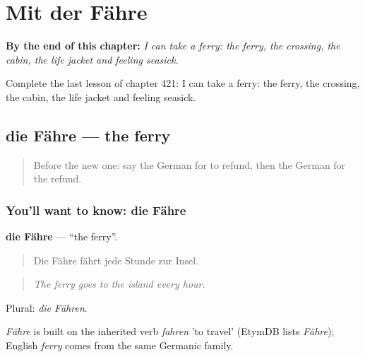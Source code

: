 
\chapter{Mit der Fähre}
\label{ch:ge-mit-der-fahre}

\begin{chapteropening}
\textbf{By the end of this chapter:} \emph{I can take a ferry: the ferry, the crossing, the cabin, the life jacket and feeling seasick.}

Complete the last lesson of chapter 421: I can take a ferry: the ferry, the crossing, the cabin, the life jacket and feeling seasick.
\end{chapteropening}

\section[die Fähre]{die Fähre — the ferry}

\label{lesson:GE-C421-faehre}



\begin{quote}
Before the new one: say the German for to refund, then the German for the refund.
\end{quote}

\subsection*{You'll want to know: die Fähre}
\textbf{die Fähre} — \textquotedblleft{}the ferry\textquotedblright{}.

\begin{quote}
Die Fähre fährt jede Stunde zur Insel.
\end{quote}

\begin{quote}
\emph{The ferry goes to the island every hour.}
\end{quote}

Plural: \emph{die Fähren}.

\begin{cousinweb}
\emph{Fähre} is built on the inherited verb \emph{fahren} 'to travel' (EtymDB lists \emph{Fähre}); English \emph{ferry} comes from the same Germanic family.
\end{cousinweb}

